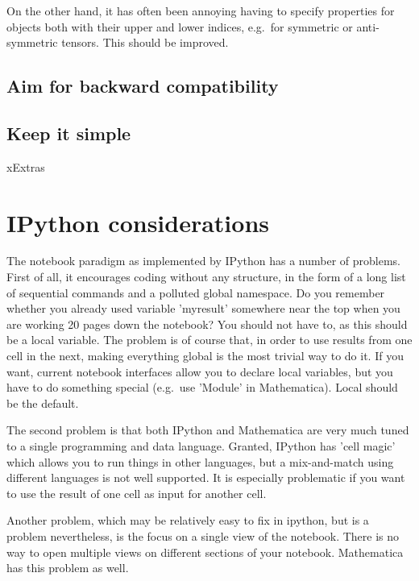 \documentclass[11pt]{article}
\begin{document}
On the other hand, it has often been annoying having to specify
properties for objects both with their upper and lower indices,
e.g.~for symmetric or anti-symmetric tensors. This should be improved.


\subsection{Aim for backward compatibility}


\subsection{Keep it simple}


xExtras

\section{IPython considerations}

The notebook paradigm as implemented by IPython has a number of
problems. First of all, it encourages coding without any structure, in
the form of a long list of sequential commands and a polluted global
namespace. Do you remember whether you already used variable
'myresult' somewhere near the top when you are working 20 pages down
the notebook? You should not have to, as this should be a local
variable. The problem is of course that, in order to use results from
one cell in the next, making everything global is the most trivial way
to do it. If you want, current notebook interfaces allow you to
declare local variables, but you have to do something special
(e.g.~use 'Module' in Mathematica). Local should be the default.

The second problem is that both IPython and Mathematica are very much
tuned to a single programming and data language. Granted, IPython has
'cell magic' which allows you to run things in other languages, but a
mix-and-match using different languages is not well supported. It is
especially problematic if you want to use the result of one cell as
input for another cell.

Another problem, which may be relatively easy to fix in ipython, but
is a problem nevertheless, is the focus on a single view of the
notebook. There is no way to open multiple views on different sections
of your notebook. Mathematica has this problem as well.


\end{document}
